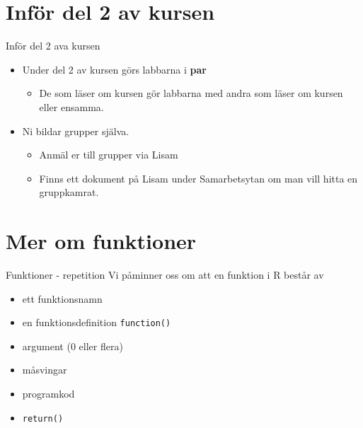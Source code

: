 \documentclass[
  11pt,
  ignorenonframetext,
]{beamer}
\providecommand{\tightlist}{%
  \setlength{\itemsep}{0pt}\setlength{\parskip}{0pt}}
\begin{document}
\section{Inför del 2 av kursen}\label{infuxf6r-del-2-av-kursen}

\begin{frame}{Inför del 2 ava kursen}
\label{infuxf6r-del-2-ava-kursen}
\begin{itemize}
\tightlist
\item
  Under del 2 av kursen görs labbarna i \textbf{par}

  \begin{itemize}
  \tightlist
  \item
    De som läser om kursen gör labbarna med andra som läser om kursen
    eller ensamma.
  \end{itemize}
\item
  Ni bildar grupper själva.

  \begin{itemize}
  \tightlist
  \item
    Anmäl er till grupper via Lisam
  \item
    Finns ett dokument på Lisam under Samarbetsytan om man vill hitta en
    gruppkamrat.
  \end{itemize}
\end{itemize}
\end{frame}

\section{Mer om funktioner}\label{mer-om-funktioner}

\begin{frame}{Funktioner - repetition}
\label{funktioner---repetition}
Vi påminner oss om att en funktion i R består av

\begin{itemize}
\tightlist
\item
  ett funktionsnamn
\item
  en funktionsdefinition \texttt{function()}
\item
  argument (0 eller flera)
\item
  måsvingar
\item
  programkod
\item
  \texttt{return()}
\end{itemize}
\end{frame}
\end{document}
